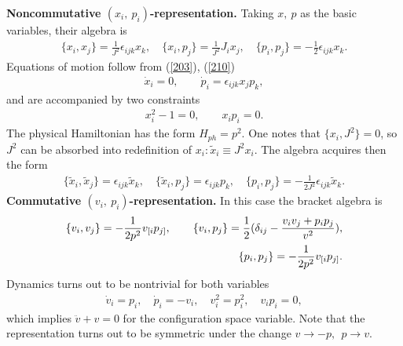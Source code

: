 \documentclass[paper a4]{article}
\begin{document}
{\bf Noncommutative $(x_i, ~ p_i)$-representation.}
Taking $x, ~ p$ as the basic variables, their algebra is
\begin{eqnarray}\label{222}
\{x_i, x_j\}=\frac{1}{J^2}\epsilon_{ijk}x_k, \quad
\{x_i, p_j\}=\frac{1}{J^2}J_ix_j, \quad
\{p_i, p_j\}=-\frac{1}{2}\epsilon_{ijk}x_k.
\end{eqnarray}
Equations of motion follow from (\ref{203}), (\ref{210})
\begin{eqnarray}\label{223}
\dot x_i=0, \qquad \dot p_i=\epsilon_{ijk}x_jp_k,
\end{eqnarray}
and are accompanied by two constraints
\begin{eqnarray}\label{224}
x_i^2-1=0, \qquad x_ip_i=0.
\end{eqnarray}
The physical Hamiltonian has the form $H_{ph}=p^2$.
One notes that $\{x_i, J^2\}=0$, so $J^2$ can be absorbed into redefinition
of $x_i: \tilde x_i\equiv J^2x_i$. The algebra acquires then the form
\begin{eqnarray}\label{225}
\{\tilde x_i, \tilde x_j\}=\epsilon_{ijk}\tilde x_k, \quad
\{\tilde x_i, p_j\}=\epsilon_{ijk}p_k, \quad
\{p_i, p_j\}=-\frac{1}{2J^2}\epsilon_{ijk}\tilde x_k.
\end{eqnarray}
{\bf Commutative $(v_i, ~ p_i)$-representation.}
In this case the bracket algebra is
\begin{eqnarray}\label{226}
\{v_i, v_j\}=-\frac{1}{2p^2}v_{[i}p_{j]}, \qquad
\{v_i, p_j\}=\frac{1}{2}(\delta_{ij}-\frac{v_iv_j+p_ip_j}{v^2}), \cr
\{p_i, p_j\}= -\frac{1}{2p^2}v_{[i}p_{j]}.
\end{eqnarray}
Dynamics turns out to be nontrivial for both variables
\begin{eqnarray}\label{227}
\dot v_i=p_i, \quad \dot p_i=-v_i, \quad
v_i^2=p_i^2, \quad v_ip_i=0,
\end{eqnarray}
which implies $\ddot v+v=0$ for the configuration space variable.
Note that the representation turns out to be symmetric under the change
$v\rightarrow -p, ~~ p\rightarrow v$.
\end{document}
